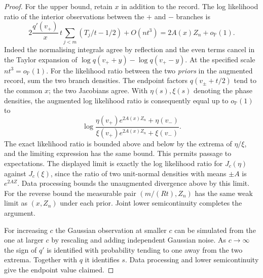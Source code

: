 \begin{proof}
For the upper bound, retain $x$ in addition to the record. The log likelihood ratio of the interior observations between the $+$ and $-$ branches is
\[
 2\frac{q'(v_+)}{x}\,t\sum_{j<m}(T_j/t-1/2)+O(nt^3)
 =2A(x)Z_n+o_{\mathbb P}(1).
\]
Indeed the normalising integrals agree by reflection and the even terms cancel in the Taylor expansion of $\log q(v_++y)-\log q(v_+-y)$. At the specified scale $nt^3=o_{\mathbb P}(1)$. For the likelihood ratio between the two \emph{priors} in the augmented record, sum the two branch densities. The endpoint factors $q(v_\pm+t/2)$ tend to the common $x$; the two Jacobians agree. With $\eta(s),\xi(s)$ denoting the phase densities, the augmented log likelihood ratio is consequently equal up to $o_{\mathbb P}(1)$ to
\[
 \log\frac{\eta(v_+)e^{2A(x)Z_n}+\eta(v_-)}
                {\xi(v_+)e^{2A(x)Z_n}+\xi(v_-)} .
\]
The exact likelihood ratio is bounded above and below by the extrema of $\eta/\xi$, and the limiting expression has the same bound. This permits passage to expectations. The displayed limit is exactly the log likelihood ratio for $J_c(\eta)$ against $J_c(\xi)$, since the ratio of two unit-normal densities with means $\pm A$ is $e^{2AZ}$. Data processing bounds the unaugmented divergence above by this limit. For the reverse bound the measurable pair $(m/(Rt),Z_n)$ has the same weak limit as $(x,Z_n)$ under each prior. Joint lower semicontinuity completes the argument.

For increasing $c$ the Gaussian observation at smaller $c$ can be simulated from the one at larger $c$ by rescaling and adding independent Gaussian noise. As $c\to\infty$ the sign of $q'$ is identified with probability tending to one away from the two extrema. Together with $q$ it identifies $s$. Data processing and lower semicontinuity give the endpoint value claimed.
\end{proof}
